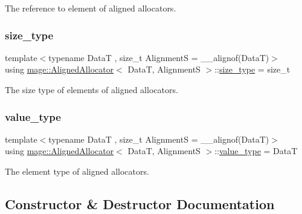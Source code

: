 The reference to element of aligned allocators. \hypertarget{structmage_1_1_aligned_allocator_a7184b9ffd131938071f9734e9291976e}{}\label{structmage_1_1_aligned_allocator_a7184b9ffd131938071f9734e9291976e} 
\subsubsection{\texorpdfstring{size\+\_\+type}{size\_type}}
{\footnotesize\ttfamily template$<$typename DataT , size\+\_\+t AlignmentS = \+\_\+\+\_\+alignof(\+Data\+T)$>$ \\
using \hyperlink{structmage_1_1_aligned_allocator}{mage\+::\+Aligned\+Allocator}$<$ DataT, AlignmentS $>$\+::\hyperlink{structmage_1_1_aligned_allocator_a7184b9ffd131938071f9734e9291976e}{size\+\_\+type} =  size\+\_\+t}

The size type of elements of aligned allocators. \hypertarget{structmage_1_1_aligned_allocator_a04614928948b5589c241726e3441e058}{}\label{structmage_1_1_aligned_allocator_a04614928948b5589c241726e3441e058} 
\subsubsection{\texorpdfstring{value\+\_\+type}{value\_type}}
{\footnotesize\ttfamily template$<$typename DataT , size\+\_\+t AlignmentS = \+\_\+\+\_\+alignof(\+Data\+T)$>$ \\
using \hyperlink{structmage_1_1_aligned_allocator}{mage\+::\+Aligned\+Allocator}$<$ DataT, AlignmentS $>$\+::\hyperlink{structmage_1_1_aligned_allocator_a04614928948b5589c241726e3441e058}{value\+\_\+type} =  DataT}

The element type of aligned allocators. 

\subsection{Constructor \& Destructor Documentation}
\hypertarget{structmage_1_1_aligned_allocator_a882b621a8276d046f3300385680442cf}{}\label{structmage_1_1_aligned_allocator_a882b621a8276d046f3300385680442cf} 
